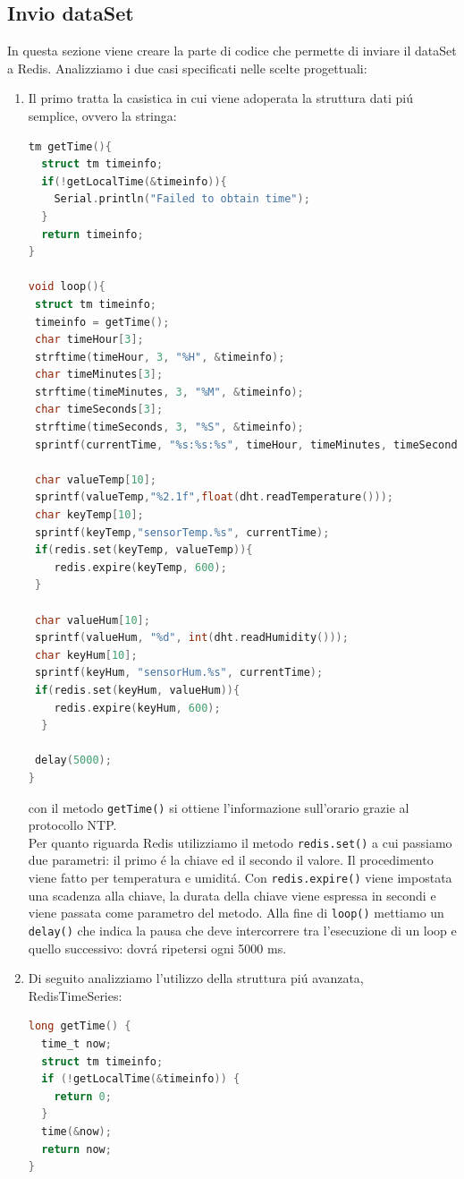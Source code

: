 \subsection{Invio dataSet}
In questa sezione viene creare la parte di codice che permette di inviare il dataSet a Redis.
Analizziamo i due casi specificati nelle scelte progettuali:
\begin{enumerate}
    \item Il primo tratta la casistica in cui viene adoperata la struttura dati piú semplice, ovvero la stringa:
\begin{lstlisting}[autogobble, style=c, language=C]
tm getTime(){
  struct tm timeinfo;
  if(!getLocalTime(&timeinfo)){
    Serial.println("Failed to obtain time");
  }
  return timeinfo;
}

void loop(){
 struct tm timeinfo;
 timeinfo = getTime();
 char timeHour[3];
 strftime(timeHour, 3, "%H", &timeinfo);
 char timeMinutes[3];
 strftime(timeMinutes, 3, "%M", &timeinfo);
 char timeSeconds[3];
 strftime(timeSeconds, 3, "%S", &timeinfo);
 sprintf(currentTime, "%s:%s:%s", timeHour, timeMinutes, timeSeconds );

 char valueTemp[10];
 sprintf(valueTemp,"%2.1f",float(dht.readTemperature()));
 char keyTemp[10];
 sprintf(keyTemp,"sensorTemp.%s", currentTime);
 if(redis.set(keyTemp, valueTemp)){
    redis.expire(keyTemp, 600);
 }

 char valueHum[10];
 sprintf(valueHum, "%d", int(dht.readHumidity()));
 char keyHum[10];
 sprintf(keyHum, "sensorHum.%s", currentTime);
 if(redis.set(keyHum, valueHum)){
    redis.expire(keyHum, 600);
  }

 delay(5000);
}\end{lstlisting}

con il metodo \texttt{getTime()} si ottiene l'informazione sull'orario grazie al protocollo NTP.\\
Per quanto riguarda Redis utilizziamo il metodo \texttt{redis.set()} a cui passiamo due parametri:
il primo é la chiave ed il secondo il valore. Il procedimento viene fatto per temperatura e umiditá.
Con \texttt{redis.expire()} viene impostata una scadenza alla chiave, la durata della chiave viene
espressa in secondi e viene passata come parametro del metodo.
Alla fine di \texttt{loop()} mettiamo un \texttt{delay()} che indica la pausa che deve intercorrere tra l'esecuzione
di un loop e quello successivo: dovrá ripetersi ogni 5000 ms.

    \item Di seguito analizziamo l'utilizzo della struttura piú avanzata, RedisTimeSeries:
\begin{lstlisting}[autogobble, style=c, language=C]
long getTime() {
  time_t now;
  struct tm timeinfo;
  if (!getLocalTime(&timeinfo)) {
    return 0;
  }
  time(&now);
  return now;
}


\end{lstlisting}
\end{enumerate}

